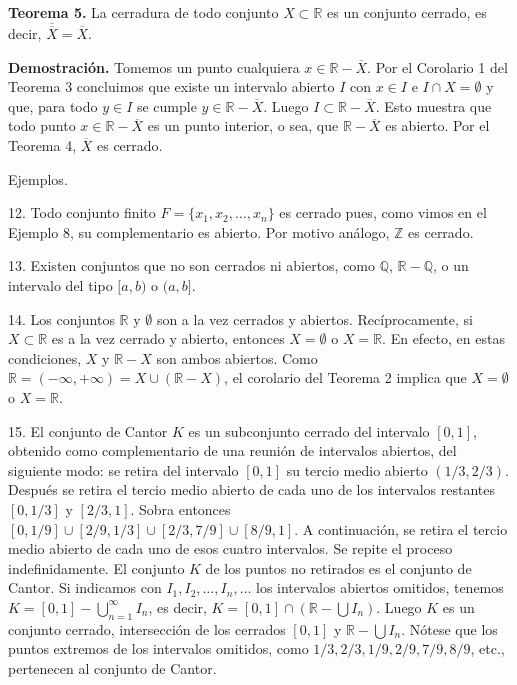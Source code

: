 \documentclass[12pt,oneside]{book}
\begin{document}
\textbf{Teorema 5.} La cerradura de todo conjunto \(X \subset \mathbb{R}\) es un conjunto cerrado, es decir, \(\overline{\overline{X}} = \overline{X}\).

\textbf{Demostración.} Tomemos un punto cualquiera \(x \in \mathbb{R} - \overline{X}\). Por el Corolario 1 del Teorema 3 concluimos que existe un intervalo abierto \(I\) con \(x \in I\) e \(I \cap X = \emptyset\) y que, para todo \(y \in I\) se cumple \(y \in \mathbb{R} - \overline{X}\). Luego \(I \subset \mathbb{R} - \overline{X}\). Esto muestra que todo punto \(x \in \mathbb{R} - \overline{X}\) es un punto interior, o sea, que \(\mathbb{R} - \overline{X}\) es abierto. Por el Teorema 4, \(\overline{X}\) es cerrado.

Ejemplos.

12. Todo conjunto finito \(F = \{x_1, x_2, \dots, x_n\}\) es cerrado pues, como vimos en el Ejemplo 8, su complementario es abierto. Por motivo análogo, \(\mathbb{Z}\) es cerrado.

13. Existen conjuntos que no son cerrados ni abiertos, como \(\mathbb{Q}\), \(\mathbb{R} - \mathbb{Q}\), o un intervalo del tipo \([a, b)\) o \((a, b]\).

14. Los conjuntos \(\mathbb{R}\) y \(\emptyset\) son a la vez cerrados y abiertos. Recíprocamente, si \(X \subset \mathbb{R}\) es a la vez cerrado y abierto, entonces \(X = \emptyset\) o \(X = \mathbb{R}\). En efecto, en estas condiciones, \(X\) y \(\mathbb{R} - X\) son ambos abiertos. Como \(\mathbb{R} = (-\infty, +\infty) = X \cup (\mathbb{R} - X)\), el corolario del Teorema 2 implica que \(X = \emptyset\) o \(X = \mathbb{R}\).

15. El conjunto de Cantor \(K\) es un subconjunto cerrado del intervalo \([0, 1]\), obtenido como complementario de una reunión de intervalos abiertos, del siguiente modo: se retira del intervalo \([0, 1]\) su tercio medio abierto \((1/3, 2/3)\). Después se retira el tercio medio abierto de cada uno de los intervalos restantes \([0, 1/3]\) y \([2/3, 1]\). Sobra entonces \([0, 1/9] \cup [2/9, 1/3] \cup [2/3, 7/9] \cup [8/9, 1]\). A continuación, se retira el tercio medio abierto de cada uno de esos cuatro intervalos. Se repite el proceso indefinidamente. El conjunto \(K\) de los puntos no retirados es el conjunto de Cantor. Si indicamos con \(I_1, I_2, \dots, I_n, \dots\) los intervalos abiertos omitidos, tenemos \(K = [0, 1] - \bigcup_{n=1}^\infty I_n\), es decir, \(K = [0, 1] \cap (\mathbb{R} - \bigcup I_n)\). Luego \(K\) es un conjunto cerrado, intersección de los cerrados \([0, 1]\) y \(\mathbb{R} - \bigcup I_n\). Nótese que los puntos extremos de los intervalos omitidos, como \(1/3, 2/3, 1/9, 2/9, 7/9, 8/9\), etc., pertenecen al conjunto de Cantor.
\end{document}
